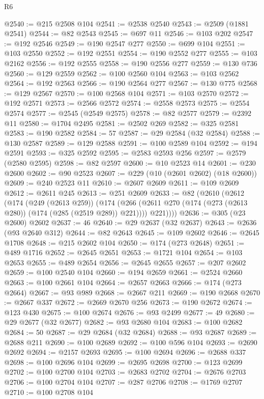 \begin{lexlean}{R6}
\begin{coremodule}
@2540 := @215 @2508 @104
@2541 := @2538 @2540
@2543 := @2509 (@1881 @2541)
@2544 := @82 @2543
@2545 := @697 @11
@2546 := @103 @202
@2547 := @192 @2546
@2549 := @190 @2547 @277
@2550 := @699 @104
@2551 := @103 @2550
@2552 := @192 @2551
@2554 := @190 @2552 @277
@2555 := @103 @2162
@2556 := @192 @2555
@2558 := @190 @2556 @277
@2559 := @130 @736
@2560 := @129 @2559
@2562 := @100 @2560 @104
@2563 := @103 @2562
@2564 := @192 @2563
@2566 := @190 @2564 @277
@2567 := @130 @775
@2568 := @129 @2567
@2570 := @100 @2568 @104
@2571 := @103 @2570
@2572 := @192 @2571
@2573 := @2566 @2572
@2574 := @2558 @2573
@2575 := @2554 @2574
@2577 := @2545 (@2549 @2575)
@2578 := @82 @2577
@2579 := @2392 @11
@2580 := @1704 @2495
@2581 := @2502 @269
@2582 := @325 @2581
@2583 := @190 @2582
@2584 := 57
@2587 := @29 @2584 (@32 @2584)
@2588 := @130 @2587
@2589 := @129 @2588
@2591 := @100 @2589 @104
@2592 := @194 @2591
@2593 := @325 @2592
@2595 := @2583 @2593 @256
@2597 := @2579 (@2580 @2595)
@2598 := @82 @2597
@2600 := @10 @2523 @14
@2601 := @230 @2600
@2602 := @90 @2523
@2607 := @229 (@10 (@2601 @2602) (@18 @2600))
@2609 := @240 @2523 @11
@2610 := @2607 @2609
@2611 := @109 @2609
@2612 := @2611 @245
@2613 := @251 @2609
@2633 := @82
    (@2610
      (@2612
        (@174
          (@249 (@2613 @259))
          (@174
            (@266 (@2611 @270 (@174 (@273 (@2613 @280)) (@174 (@285 (@2519 @289)) @221))))
            @221))))
@2636 := @305 (@23 @2600) @2602
@2637 := 46
@2640 := @29 @2637 (@32 @2637)
@2643 := @2636 (@93 @2640 @312)
@2644 := @82 @2643
@2645 := @109 @2602
@2646 := @2645 @1708
@2648 := @215 @2602 @104
@2650 := @174 (@273 @2648)
@2651 := @489 @1716
@2652 := @2645 @2651
@2653 := @1721 @104
@2654 := @103 @2653
@2655 := @489 @2654
@2656 := @2645 @2655
@2657 := @207 @2602
@2659 := @100 @2540 @104
@2660 := @194 @2659
@2661 := @2524 @2660
@2663 := @100 @2661 @104
@2664 := @2657 @2663
@2666 := @174 (@273 @2664)
@2667 := @93 @989
@2668 := @2667 @211
@2669 := @190 @2668
@2670 := @2667 @337
@2672 := @2669 @2670 @256
@2673 := @190 @2672
@2674 := @123 @430
@2675 := @100 @2674
@2676 := @93 @2499
@2677 := 49
@2680 := @29 @2677 (@32 @2677)
@2682 := @93 @2680 @104
@2683 := @100 @2682
@2684 := 50
@2687 := @29 @2684 (@32 @2684)
@2688 := @93 @2687
@2689 := @2688 @211
@2690 := @100 @2689
@2692 := @100 @596 @104
@2693 := @2690 @2692
@2694 := @2157 @2693
@2695 := @100 @2694
@2696 := @2688 @337
@2698 := @100 @2696 @104
@2699 := @2695 @2698
@2700 := @123 @2699
@2702 := @100 @2700 @104
@2703 := @2683 @2702
@2704 := @2676 @2703
@2706 := @100 @2704 @104
@2707 := @287 @2706
@2708 := @1769 @2707
@2710 := @100 @2708 @104

\end{coremodule}
\end{lexlean}
